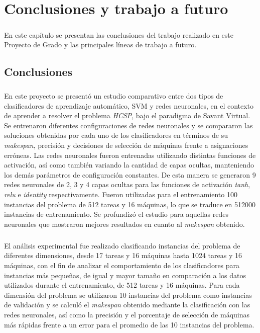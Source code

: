 \chapter{Conclusiones y trabajo a futuro} \label{section-conclusiones}

\paragraph{}En este capítulo se presentan las conclusiones del trabajo realizado en este Proyecto de Grado y las principales líneas de trabajo a futuro.

\section{Conclusiones}

\paragraph{}En este proyecto se presentó un estudio comparativo entre dos tipos de clasificadores de aprendizaje automático, SVM y redes neuronales, en el contexto de aprender a resolver el problema \textit{HCSP}, bajo el paradigma de Savant Virtual.
Se entrenaron diferentes configuraciones de redes neuronales y se compararon las soluciones obtenidas por cada uno de los clasificadores en términos de su \textit{makespan}, precisión y decisiones de selección de máquinas frente a asignaciones erróneas.
Las redes neuronales fueron entrenadas utilizando distintas funciones de activación, así como también variando la cantidad de capas ocultas, manteniendo los demás parámetros de configuración constantes.
De esta manera se generaron 9 redes neuronales de 2, 3 y 4 capas ocultas para las funciones de activación \textit{tanh}, \textit{relu} e \textit{identity} respectivamente.
Fueron utilizadas para el entrenamiento 100 instancias del problema de 512 tareas y 16 máquinas, lo que se traduce en 512000 instancias de entrenamiento.
Se profundizó el estudio para aquellas redes neuronales que mostraron mejores resultados en cuanto al \textit{makespan} obtenido.

\paragraph{}El análisis experimental fue realizado clasificando instancias del problema de diferentes dimensiones, desde 17 tareas y 16 máquinas hasta 1024 tareas y 16 máquinas, con el fin de analizar el comportamiento de los clasificadores para instancias más pequeñas, de igual y mayor tamaño en comparación a los datos utilizados durante el entrenamiento, de 512 tareas y 16 máquinas.
Para cada dimensión del problema se utilizaron 10 instancias del problema como instancias de validación y se calculó el \textit{makespan} obtenido mediante la clasificación con las redes neuronales, así como la precisión y el porcentaje de selección de máquinas más rápidas frente a un error para el promedio de las 10 instancias del problema.

